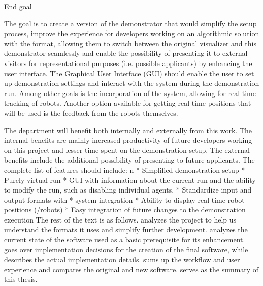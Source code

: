 \sec End goal

The goal is to create a version of the demonstrator that would simplify the setup process, improve the experience for developers working on an algorithmic solution with the {\mapfIR} format, allowing them to switch between the original visualizer and this demonstrator seamlessly and enable the possibility of presenting it to external visitors for representational purposes (i.e. possible applicants) by enhancing the user interface.\br
The Graphical User Interface (GUI) should enable the user to set up demonstration settings and interact with the system during the demonstration run.
Among other goals is the incorporation of the {\vicon} system, allowing for real-time tracking of robots. Another option available for getting real-time positions that will be used is the feedback from the robots themselves.\br
\br

The department will benefit both internally and externally from this work. The internal benefits are mainly increased productivity of future developers working on this project and lesser time spent on the demonstration setup. The external benefits include the additional possibility of presenting to future applicants.
The complete list of features should include:
\begitems \style n
    * Simplified demonstration setup
    * Purely virtual run
    * GUI with information about the current run and the ability to modify the run, such as disabling individual agents. 
    * Standardize input and output formats with \mapfIR
    * {\vicon} system integration
    * Ability to display real-time robot positions ({\vicon}/robots)
    * Easy integration of future changes to the demonstration execution
\enditems
\br
The rest of the text is as follows.\br
{} analyzes the {\mapfIR} project to help us understand the formats it uses and simplify further development. {} analyzes the current state of the software used as a basic prerequisite for its enhancement. {} goes over implementation decisions for the creation of the final software, while {} describes the actual implementation details. {} sums up the workflow and user experience and compares the original and new software. {} serves as the summary of this thesis.